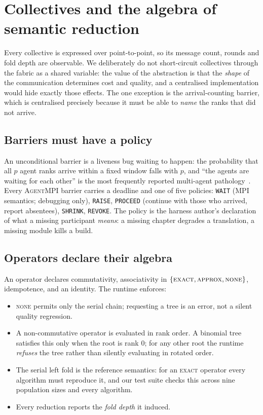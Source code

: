 \documentclass[10pt,twocolumn]{article}
\theoremstyle{definition}
\theoremstyle{plain}
\newcommand{\ampi}{\textsc{AgentMPI}}
\newcommand{\code}[1]{\texttt{\small #1}}
\begin{document}
\section{Collectives and the algebra of semantic reduction}
\label{sec:coll}

Every collective is expressed over point-to-point, so its message count, rounds and
fold depth are observable. We deliberately do not short-circuit collectives through
the fabric as a shared variable: the value of the abstraction is that the
\emph{shape} of the communication determines cost and quality, and a centralised
implementation would hide exactly those effects. The one exception is the
arrival-counting barrier, which is centralised precisely because it must be able to
\emph{name} the ranks that did not arrive.

\subsection{Barriers must have a policy}

An unconditional barrier is a liveness bug waiting to happen: the probability that
all $p$ agent ranks arrive within a fixed window falls with $p$, and ``the agents
are waiting for each other'' is the most frequently reported multi-agent
pathology~\cite{mast}. Every \ampi{} barrier carries a deadline and one of five
policies: \code{WAIT} (MPI semantics; debugging only), \code{RAISE},
\code{PROCEED} (continue with those who arrived, report absentees), \code{SHRINK},
\code{REVOKE}. The policy is the harness author's declaration of what a missing
participant \emph{means}: a missing chapter degrades a translation, a missing
module kills a build.

\subsection{Operators declare their algebra}

An operator declares commutativity, associativity in
$\{\textsc{exact},\textsc{approx},\textsc{none}\}$, idempotence, and an identity.
The runtime enforces:

\begin{itemize}\itemsep2pt
\item \textsc{none} permits only the serial chain; requesting a tree is an error,
not a silent quality regression.
\item A non-commutative operator is evaluated in rank order. A binomial tree
satisfies this only when the root is rank 0; for any other root the runtime
\emph{refuses} the tree rather than silently evaluating in rotated order.
\item The serial left fold is the reference semantics: for an \textsc{exact}
operator every algorithm must reproduce it, and our test suite checks this across
nine population sizes and every algorithm.
\item Every reduction reports the \emph{fold depth} it induced.
\end{itemize}
\end{document}
